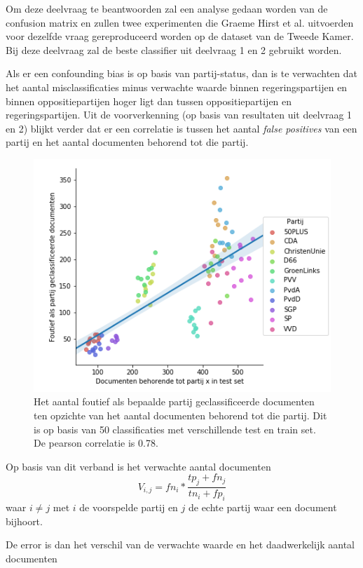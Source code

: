 Om deze deelvraag te beantwoorden zal een analyse gedaan worden van de confusion matrix en zullen twee experimenten die Graeme Hirst et al. uitvoerden voor dezelfde vraag gereproduceerd worden op de dataset van de Tweede Kamer. Bij deze deelvraag zal de beste classifier uit deelvraag 1 en 2 gebruikt worden.\par
Als er een confounding bias is op basis van partij-status, dan is te verwachten dat het aantal misclassificaties minus verwachte waarde binnen regeringspartijen en binnen oppositiepartijen hoger ligt dan tussen oppositiepartijen en regeringspartijen. Uit de voorverkenning (op basis van resultaten uit deelvraag 1 en 2) blijkt verder dat er een correlatie is tussen het aantal \textit{false positives} van een partij en het aantal documenten behorend tot die partij.
\begin{figure}[H]
  \centering
    \includegraphics[width=0.60\paperwidth]{Verslag/Tables/Correlation.png}
\caption{Het aantal foutief als bepaalde partij geclassificeerde documenten ten opzichte van het aantal documenten behorend tot die partij. Dit is op basis van 50 classificaties met verschillende test en train set. De pearson correlatie is 0.78.}
\label{fig:correlation}
\end{figure}
Op basis van dit verband is het verwachte aantal documenten
\begin{equation}
V_{i,j}  = fn_i *  \frac{tp_{j}+fn_{j}}{tn_{i}+fp_{i}}
\end{equation}
waar $i\neq j$ met $i$ de voorspelde partij en $j$ de echte partij waar een document bijhoort.\par
De error is dan het verschil van de verwachte waarde en het daadwerkelijk aantal documenten
